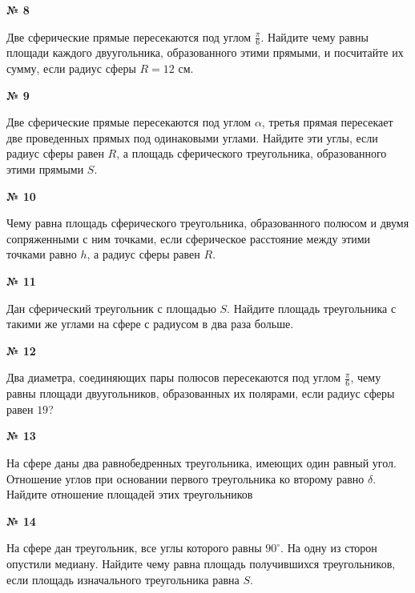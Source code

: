     \begin{center}
        \textbf{№ 8}
    \end{center}
    Две сферические прямые пересекаются под углом $\frac{\pi}{6}$.
    Найдите чему равны площади каждого двуугольника, образованного этими прямыми, и посчитайте их сумму,
    если радиус сферы $R=12$ см.

    \begin{center}
        \textbf{№ 9}
    \end{center}

    Две сферические прямые пересекаются под углом $\alpha$, третья прямая пересекает две проведенных прямых
    под одинаковыми углами.
    Найдите эти углы, если радиус сферы равен $R$, а площадь сферического треугольника, образованного этими прямыми $S$.

    \begin{center}
        \textbf{№ 10}
    \end{center}

    Чему равна площадь сферического треугольника, образованного полюсом и двумя сопряженными с ним точками,
    если сферическое расстояние между этими точками равно $h$, а радиус сферы равен $R$.

    \begin{center}
        \textbf{№ 11}
    \end{center}

    Дан сферический треугольник с площадью $S$.
    Найдите площадь треугольника с такими же углами на сфере с радиусом в два раза больше.

    \begin{center}
        \textbf{№ 12}
    \end{center}

    Два диаметра, соединяющих пары полюсов пересекаются под углом $\frac{\pi}{6}$,
    чему равны площади двуугольников, образованных их полярами, если радиус сферы равен $19$?

    \begin{center}
        \textbf{№ 13}
    \end{center}

    На сфере даны два равнобедренных треугольника, имеющих один равный угол.
    Отношение углов при основании первого треугольника ко второму равно $\delta$.
    Найдите отношение площадей этих треугольников

    \begin{center}
        \textbf{№ 14}
    \end{center}

    На сфере дан треугольник, все углы которого равны $90^\circ$.
    На одну из сторон опустили медиану.
    Найдите чему равна площадь получившихся треугольников, если площадь изначального треугольника равна $S$.

